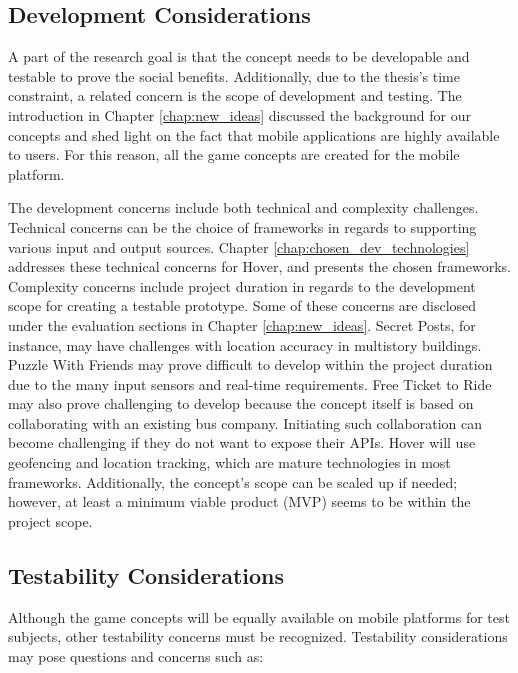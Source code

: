 \subsection{Development Considerations}
A part of the research goal is that the concept needs to be developable and testable to prove the social benefits. Additionally, due to the thesis’s time constraint, a related concern is the scope of development and testing. The introduction in Chapter \ref{chap:new_ideas} discussed the background for our concepts and shed light on the fact that mobile applications are highly available to users. For this reason, all the game concepts are created for the mobile platform. 

The development concerns include both technical and complexity challenges. Technical concerns can be the choice of frameworks in regards to supporting various input and output sources. Chapter \ref{chap:chosen_dev_technologies} addresses these technical concerns for Hover, and presents the chosen frameworks. Complexity concerns include project duration in regards to the development scope for creating a testable prototype. Some of these concerns are disclosed under the evaluation sections in Chapter \ref{chap:new_ideas}. Secret Posts, for instance, may have challenges with location accuracy in multistory buildings. Puzzle With Friends may prove difficult to develop within the project duration due to the many input sensors and real-time requirements. Free Ticket to Ride may also prove challenging to develop because the concept itself is based on collaborating with an existing bus company. Initiating such collaboration can become challenging if they do not want to expose their APIs. Hover will use geofencing and location tracking, which are mature technologies in most frameworks. Additionally, the concept’s scope can be scaled up if needed; however, at least a minimum viable product (MVP) seems to be within the project scope.

\subsection{Testability Considerations}
Although the game concepts will be equally available on mobile platforms for test subjects, other testability concerns must be recognized. Testability considerations may pose questions and concerns such as: 

